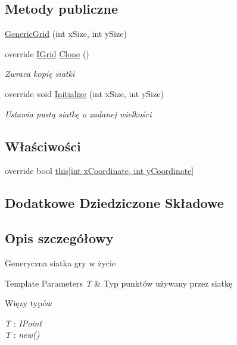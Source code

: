 \subsection*{Metody publiczne}
\begin{DoxyCompactItemize}
\item 
\hyperlink{class_convay_1_1_core_1_1_generic_grid_a3507e1f2a0efa825457ad47b6c4121b2}{Generic\+Grid} (int x\+Size, int y\+Size)
\item 
override \hyperlink{interface_convay_1_1_core_1_1_interfaces_1_1_i_grid}{I\+Grid} \hyperlink{class_convay_1_1_core_1_1_generic_grid_af2556688d2c1a33797ce8f79d15836b4}{Clone} ()
\begin{DoxyCompactList}\small\item\em Zwraca kopię siatki \end{DoxyCompactList}\item 
override void \hyperlink{class_convay_1_1_core_1_1_generic_grid_a5d39ff67bb67b6a70455ecd61fc1a0ef}{Initialize} (int x\+Size, int y\+Size)
\begin{DoxyCompactList}\small\item\em Ustawia pustą siatkę o zadanej wielkości \end{DoxyCompactList}\end{DoxyCompactItemize}
\subsection*{Właściwości}
\begin{DoxyCompactItemize}
\item 
override bool \hyperlink{class_convay_1_1_core_1_1_generic_grid_aa87f9cbce32d294ecfd66a36e7b38152}{this\mbox{[}int x\+Coordinate, int y\+Coordinate\mbox{]}}
\end{DoxyCompactItemize}
\subsection*{Dodatkowe Dziedziczone Składowe}


\subsection{Opis szczegółowy}
Generyczna siatka gry w życie 


\begin{DoxyTemplParams}{Template Parameters}
{\em T} & Typ punktów używany przez siatkę\\
\hline
\end{DoxyTemplParams}
\begin{Desc}
\item[Więzy typów]\begin{description}
\item[{\em T} : {\em I\+Point}]\item[{\em T} : {\em new()}]\end{description}
\end{Desc}


